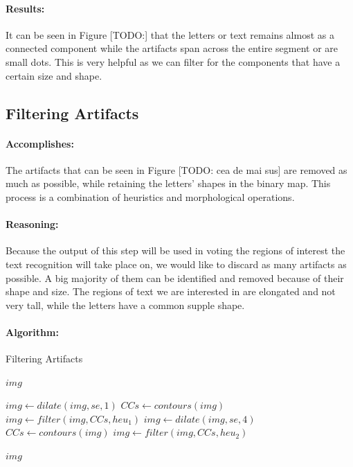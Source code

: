 \paragraph*{Results:}\mbox{}\par
It can be seen in Figure [TODO:] that the letters or text remains almost as a connected component while the artifacts span across the entire segment or are small dots. This is very helpful as we can filter for the components that have a certain size and shape.

\subsection{Filtering Artifacts}

\paragraph*{Accomplishes:}\mbox{}\par
The artifacts that can be seen in Figure [TODO: cea de mai sus] are removed as much as possible, while retaining the letters' shapes in the binary map. This process is a combination of heuristics and morphological operations.

\paragraph*{Reasoning:}\mbox{}\par
Because the output of this step will be used in voting the regions of interest the text recognition will take place on, we would like to discard as many artifacts as possible. A big majority of them can be identified and removed because of their shape and size. The regions of text we are interested in are elongated and not very tall, while the letters have a common supple shape.

\paragraph*{Algorithm:}\mbox{}\par

\begin{algorithm}
    \caption{Filtering Artifacts}\label{alg:filtering-artifacts}
    \begin{algorithmic}[1]
        \Require $img$

        \State $img \gets dilate(img, se, 1)$
        \State $CCs \gets contours(img)$\label{alg:filtering-artifacts:contours-1}
        \State $img \gets filter(img, CCs, heu_1)$\label{alg:filtering-artifacts:filter-1}
        \State $img \gets dilate(img, se, 4)$
        \State $CCs \gets contours(img)$
        \State $img \gets filter(img, CCs, heu_2)$\label{alg:filtering-artifacts:filter-2}

        \State \Return $img$
    \end{algorithmic}
\end{algorithm}

